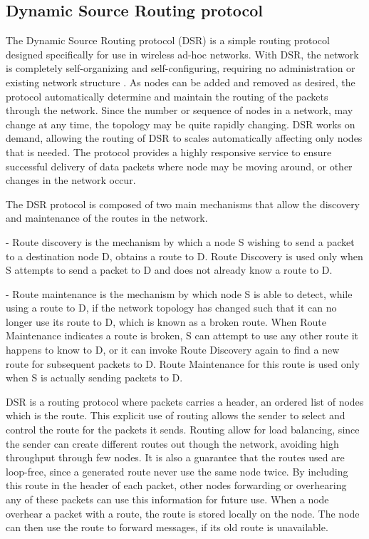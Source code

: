 \subsection{Dynamic Source Routing protocol}
The Dynamic Source Routing protocol (DSR) is a simple routing protocol designed specifically for use in wireless ad-hoc networks.
With DSR, the network is completely self-organizing and self-configuring, requiring no administration or existing network structure \cite{DSR}. 
As nodes can be added and removed as desired, the protocol automatically determine and maintain the routing of the packets through the network.
Since the number or sequence of nodes in a network, may change at any time, the topology may be quite rapidly changing.
DSR works on demand, allowing the routing of DSR to scales automatically affecting only nodes that is needed.
The protocol provides a highly responsive service to ensure successful delivery of data packets where node may be moving around, or other changes in the network occur\cite{DSR}. 

The DSR protocol is composed of two main mechanisms that allow the discovery and maintenance of the routes in the network.

- Route discovery is the mechanism by which a node S wishing to send a packet to a destination node D, obtains a route to D.
Route Discovery is used only when S attempts to send a packet to D and does not already know a route to D.

- Route maintenance is the mechanism by which node S is able to detect, while using a route to D, if the network topology has changed such that it can no longer use its route to D, which is known as a broken route.
When Route Maintenance indicates a route is broken, S can attempt to use any other route it happens to know to D, or it can invoke Route Discovery again to find a new route for subsequent packets to D.
Route Maintenance for this route is used only when S is actually sending packets to D.

DSR is a routing protocol where packets carries a header, an ordered list of nodes which is the route.
This explicit use of routing allows the sender to select and control the route for the packets it sends.
Routing allow for load balancing, since the sender can create different routes out though the network, avoiding high throughput through few nodes.
It is also a guarantee that the routes used are loop-free, since a generated route never use the same node twice.
By including this route in the header of each packet, other nodes forwarding or overhearing any of these packets can use this information for future use\cite{DSR}.
When a node overhear a packet with a route, the route is stored locally on the node.
The node can then use the route to forward messages, if its old route is unavailable.

